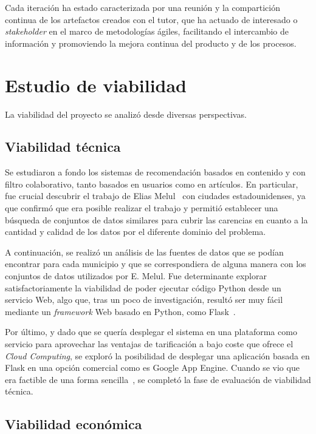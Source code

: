 Cada iteración ha estado caracterizada por una reunión y la compartición continua de los artefactos creados con el tutor, que ha actuado de interesado o \textit{stakeholder} en el marco de metodologías ágiles, facilitando el intercambio de información y promoviendo la mejora continua del producto y de los procesos.

\section{Estudio de viabilidad}

La viabilidad del proyecto se analizó desde diversas perspectivas.

\subsection{Viabilidad técnica}

Se estudiaron a fondo los sistemas de recomendación basados en contenido y con filtro colaborativo, tanto basados en usuarios como en artículos. En particular, fue crucial descubrir el trabajo de Elias Melul~\cite{US1, US2, US3} con ciudades estadounidenses, ya que confirmó que era posible realizar el trabajo y permitió establecer una búsqueda de conjuntos de datos similares para cubrir las carencias en cuanto a la cantidad y calidad de los datos por el diferente dominio del problema.

A continuación, se realizó un análisis de las fuentes de datos que se podían encontrar para cada municipio y que se correspondiera de alguna manera con los conjuntos de datos utilizados por E. Melul. Fue determinante explorar satisfactoriamente la viabilidad de poder ejecutar código Python desde un servicio Web, algo que, tras un poco de investigación, resultó ser muy fácil mediante un \textit{framework} Web basado en Python, como Flask~\cite{flask_so}.

Por último, y dado que se quería desplegar el sistema en una plataforma como servicio para aprovechar las ventajas de tarificación a bajo coste que ofrece el \textit{Cloud Computing}, se exploró la posibilidad de desplegar una aplicación basada en Flask en una opción comercial como es Google App Engine. Cuando se vio que era factible de una forma sencilla~\cite{flask_app_engine}, se completó la fase de evaluación de viabilidad técnica.

\subsection{Viabilidad económica}

